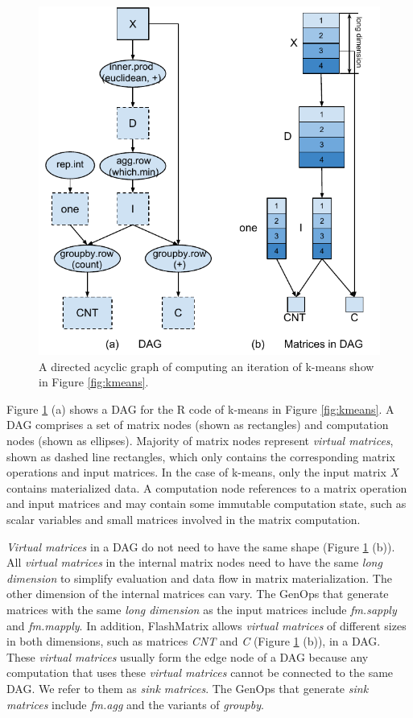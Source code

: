 \begin{figure}
	\centering
	\includegraphics[scale=0.6]{FlashMatrix_figs/KMeans.pdf}
	\caption{A directed acyclic graph of computing an iteration of k-means
	show in Figure \ref{fig:kmeans}.}
	\label{fig:DAG}
\end{figure}

Figure \ref{fig:DAG} (a) shows a DAG for the R code of k-means in Figure
\ref{fig:kmeans}. A DAG comprises a set of matrix nodes (shown as rectangles)
and computation nodes (shown as ellipses). Majority of matrix nodes represent
\textit{virtual matrices}, shown as dashed line rectangles, which only contains
the corresponding matrix operations and input matrices. In the case of k-means,
only the input matrix \textit{X} contains materialized data.
A computation node references to a matrix operation and input matrices and
may contain some immutable computation state, such as scalar variables and
small matrices involved in the matrix computation. 

\textit{Virtual matrices} in a DAG do not need to have
the same shape (Figure \ref{fig:DAG} (b)). All \textit{virtual matrices} in
the internal matrix nodes need to have the same \textit{long dimension} to
simplify evaluation and data flow in matrix materialization. The other dimension
of the internal matrices can vary. The GenOps that generate matrices with
the same \textit{long dimension} as the input matrices include
\textit{fm.sapply} and \textit{fm.mapply}. In addition, FlashMatrix allows
\textit{virtual matrices} of different sizes in both dimensions, such as
matrices \textit{CNT} and \textit{C} (Figure \ref{fig:DAG} (b)), in a DAG.
These \textit{virtual matrices} usually form the edge node of a DAG because
any computation that uses these \textit{virtual matrices} cannot be connected
to the same DAG.  We refer to them as \textit{sink matrices}. The GenOps that
generate \textit{sink matrices} include \textit{fm.agg} and the variants of
\textit{groupby}.

